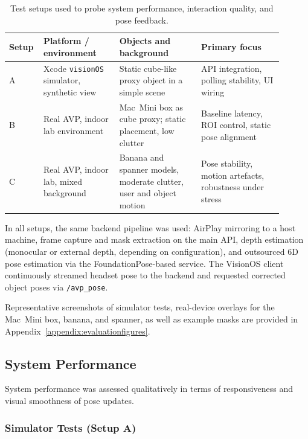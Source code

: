\begin{table}[H]
    \centering
    \caption[Test matrix for prototype evaluation]{Test setups used to probe system performance, interaction quality, and pose feedback.}
    \label{tab:testmatrix}
    \begin{tabular}{@{}p{0.08\linewidth}p{0.26\linewidth}p{0.28\linewidth}p{0.28\linewidth}@{}}
        \toprule
        \textbf{Setup} & \textbf{Platform / environment} & \textbf{Objects and background} & \textbf{Primary focus} \\
        \midrule
        A &
        Xcode \texttt{visionOS} simulator, synthetic view &
        Static cube-like proxy object in a simple scene &
        API integration, polling stability, UI wiring \\
        B &
        Real AVP, indoor lab environment &
        Mac~Mini box as cube proxy; static placement, low clutter &
        Baseline latency, ROI control, static pose alignment \\
        C &
        Real AVP, indoor lab, mixed background &
        Banana and spanner models, moderate clutter, user and object motion &
        Pose stability, motion artefacts, robustness under stress \\
        \bottomrule
    \end{tabular}
\end{table}

In all setups, the same backend pipeline was used: AirPlay mirroring to a host machine, frame capture and mask extraction on the main API, depth estimation (monocular or external depth, depending on configuration), and outsourced 6D pose estimation via the FoundationPose-based service. The VisionOS client continuously streamed headset pose to the backend and requested corrected object poses via \texttt{/avp\_pose}.  

Representative screenshots of simulator tests, real-device overlays for the Mac~Mini box, banana, and spanner, as well as example masks are provided in Appendix~\ref{appendix:evaluationfigures}.

\subsection{System Performance}

System performance was assessed qualitatively in terms of responsiveness and visual smoothness of pose updates.

\subsubsection{Simulator Tests (Setup A)}

